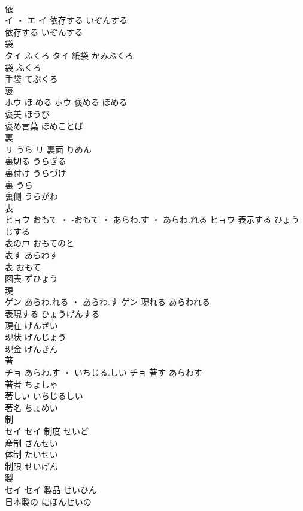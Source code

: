 \documentclass[8pt]{extreport}
\begin{document}
\begin{CJK}{UTF8}{min}
\\	依	
\\	イ ・ エ		イ	依存する	いぞんする	
\\	依存する	いぞんする	
\\	袋	
\\	タイ	ふくろ	タイ	紙袋	かみぶくろ	
\\	袋	ふくろ	
\\	手袋	てぶくろ	
\\	褒	
\\	ホウ	ほ.める	ホウ	褒める	ほめる	
\\	褒美	ほうび	
\\	褒め言葉	ほめことば	
\\	裏	
\\	リ	うら	リ	裏面	りめん	
\\	裏切る	うらぎる	
\\	裏付け	うらづけ	
\\	裏	うら	
\\	裏側	うらがわ	
\\	表	
\\	ヒョウ	おもて ・ -おもて ・ あらわ.す ・ あらわ.れる	ヒョウ	表示する	ひょうじする	
\\	表の戸	おもてのと	
\\	表す	あらわす	
\\	表	おもて	
\\	図表	ずひょう	
\\	現	
\\	ゲン	あらわ.れる ・ あらわ.す	ゲン	現れる	あらわれる	
\\	表現する	ひょうげんする	
\\	現在	げんざい	
\\	現状	げんじょう	
\\	現金	げんきん	
\\	著	
\\	チョ	あらわ.す ・ いちじる.しい	チョ	著す	あらわす	
\\	著者	ちょしゃ	
\\	著しい	いちじるしい	
\\	著名	ちょめい	
\\	制	
\\	セイ		セイ	制度	せいど	
\\	産制	さんせい	
\\	体制	たいせい	
\\	制限	せいげん	
\\	製	
\\	セイ		セイ	製品	せいひん	
\\	日本製の	にほんせいの	

\end{CJK}
\end{document}
